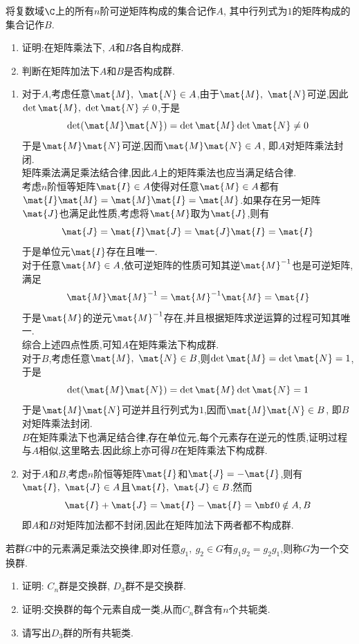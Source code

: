 \documentclass{ctexart}
\begin{document}
\begin{homework}[2.]
    将复数域$\C$上的所有$n$阶可逆矩阵构成的集合记作$A$, 其中行列式为$1$的矩阵构成的集合记作$B$.
    \begin{enumerate}[label=\tbf{(\alph*)}]
        \item 证明:在矩阵乘法下, $A$和$B$各自构成群.
        \item 判断在矩阵加法下$A$和$B$是否构成群.
    \end{enumerate}
\end{homework}
\begin{solution}
\begin{enumerate}[label=\tbf{(\alph*)}]
    \item 对于$A$,考虑任意$\mat{M},\ \mat{N}\in A$,由于$\mat{M},\ \mat{N}$可逆,因此$\det\mat{M},\ \det\mat{N}\neq0$,于是
    \[\det(\mat{M}\mat{N})=\det\mat{M}\det\mat{N}\neq0\]
    于是$\mat{M}\mat{N}$可逆,因而$\mat{M}\mat{N}\in A$, 即$A$对矩阵乘法封闭.\\
    矩阵乘法满足乘法结合律,因此$A$上的矩阵乘法也应当满足结合律.\\
    考虑$n$阶恒等矩阵$\mat{I}\in A$使得对任意$\mat{M}\in A$都有$\mat{I}\mat{M}=\mat{M}\mat{I}=\mat{M}$.如果存在另一矩阵$\mat{J}$也满足此性质,考虑将$\mat{M}$取为$\mat{J}$,则有
    \[\mat{J}=\mat{I}\mat{J}=\mat{J}\mat{I}=\mat{I}\]
    于是单位元$\mat{I}$存在且唯一.\\
    对于任意$\mat{M}\in A$,依可逆矩阵的性质可知其逆$\mat{M}^{-1}$也是可逆矩阵,满足
    \[\mat{M}\mat{M}^{-1}=\mat{M}^{-1}\mat{M}=\mat{I}\]
    于是$\mat{M}$的逆元$\mat{M}^{-1}$存在,并且根据矩阵求逆运算的过程可知其唯一.\\
    综合上述四点性质,可知$A$在矩阵乘法下构成群.\\
    对于$B$,考虑任意$\mat{M},\ \mat{N}\in B$,则$\det\mat{M}=\det\mat{N}=1$,于是
    \[\det(\mat{M}\mat{N})=\det\mat{M}\det\mat{N}=1\]
    于是$\mat{M}\mat{N}$可逆并且行列式为$1$,因而$\mat{M}\mat{N}\in B$, 即$B$对矩阵乘法封闭.\\
    $B$在矩阵乘法下也满足结合律,存在单位元,每个元素存在逆元的性质,证明过程与$A$相似,这里略去.因此综上亦可得$B$在矩阵乘法下构成群.
    \item 对于$A$和$B$,考虑$n$阶恒等矩阵$\mat{I}$和$\mat{J}=-\mat{I}$,则有$\mat{I},\ \mat{J}\in A$且$\mat{I},\ \mat{J}\in B$.然而
    \[\mat{I}+\mat{J}=\mat{I}-\mat{I}=\mbf0\notin A,B\]
    即$A$和$B$对矩阵加法都不封闭,因此在矩阵加法下两者都不构成群.
\end{enumerate}
\end{solution}
\begin{homework}[3.]
    若群$G$中的元素满足乘法交换律,即对任意$g_1,\ g_2\in G$有$g_1g_2=g_2g_1$,则称$G$为一个交换群.
    \begin{enumerate}[label=\tbf{(\alph*)}]
        \item 证明: $C_n$群是交换群, $D_3$群不是交换群.
        \item 证明:交换群的每个元素自成一类,从而$C_n$群含有$n$个共轭类.
        \item 请写出$D_3$群的所有共轭类.
    \end{enumerate}
\end{homework}
\end{document}
